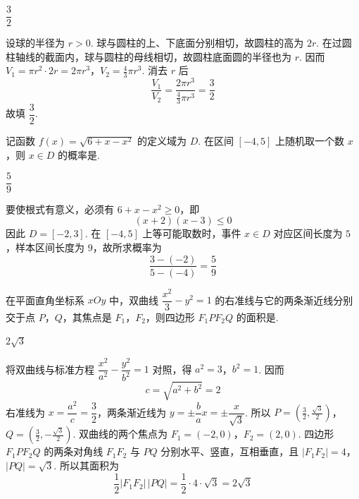 \begin{answer}
\(\dfrac32\)
\end{answer}

\begin{solution}
设球的半径为 \(r>0\). 球与圆柱的上、下底面分别相切，故圆柱的高为 \(2r\). 在过圆柱轴线的截面内，球与圆柱的母线相切，故圆柱底面圆的半径也为 \(r\). 因而
\(V_1=\pi r^2\cdot2r=2\pi r^3\)，\(V_2=\frac43\pi r^3\).
消去 \(r\) 后
\[
\frac{V_1}{V_2}=\frac{2\pi r^3}{\frac43\pi r^3}=\frac32
\]
故填 \(\dfrac32\).
\end{solution}



\begin{problem}
记函数 \(f(x)=\sqrt{6+x-x^2}\) 的定义域为 \(D\). 在区间 \([-4,5]\) 上随机取一个数 \(x\)，则 \(x\in D\) 的概率是\fillinblank{}.
\end{problem}

\begin{answer}
\(\dfrac59\)
\end{answer}

\begin{solution}
要使根式有意义，必须有 \(6+x-x^2\ge0\)，即
\[
(x+2)(x-3)\le0
\]
因此 \(D=[-2,3]\). 在 \([-4,5]\) 上等可能取数时，事件 \(x\in D\) 对应区间长度为 \(5\)，样本区间长度为 \(9\)，故所求概率为
\[
\frac{3-(-2)}{5-(-4)}=\frac59
\]
\end{solution}



\begin{problem}
在平面直角坐标系 \(xOy\) 中，双曲线 \(\dfrac{x^2}{3}-y^2=1\) 的右准线与它的两条渐近线分别交于点 \(P\)，\(Q\)，其焦点是 \(F_1\)，\(F_2\)，则四边形 \(F_1PF_2Q\) 的面积是\fillinblank{}.
\end{problem}

\begin{answer}
\(2\sqrt{3}\)
\end{answer}

\begin{solution}
将双曲线与标准方程 \(\dfrac{x^2}{a^2}-\dfrac{y^2}{b^2}=1\) 对照，得 \(a^2=3\)，\(b^2=1\). 因而
\[
c=\sqrt{a^2+b^2}=2
\]
右准线为 \(x=\dfrac{a^2}{c}=\dfrac32\)，两条渐近线为 \(y=\pm\dfrac ba x=\pm\dfrac{x}{\sqrt3}\). 所以
\(P=\left(\frac32,\frac{\sqrt3}{2}\right)\)，\(Q=\left(\frac32,-\frac{\sqrt3}{2}\right)\).
双曲线的两个焦点为 \(F_1=(-2,0)\)，\(F_2=(2,0)\). 四边形 \(F_1PF_2Q\) 的两条对角线 \(F_1F_2\) 与 \(PQ\) 分别水平、竖直，互相垂直，且
\(\lvert F_1F_2\rvert=4\)，\(\lvert PQ\rvert=\sqrt3\).
所以其面积为
\[
\frac12\lvert F_1F_2\rvert\,\lvert PQ\rvert=\frac12\cdot4\cdot\sqrt3=2\sqrt3
\]
\end{solution}



